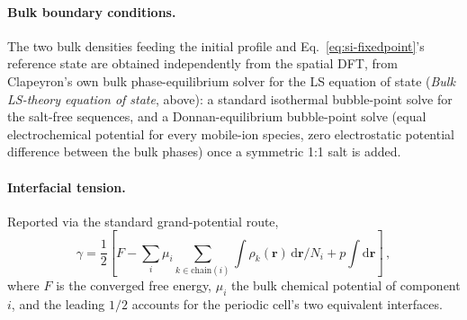 \documentclass[journal=macl,manuscript=suppinfo,layout=onecolumn]{achemso}
\begin{document}
\paragraph{Bulk boundary conditions.} The two bulk densities feeding the initial profile and Eq.~\ref{eq:si-fixedpoint}'s reference state are obtained independently from the spatial DFT, from Clapeyron's own bulk phase-equilibrium solver for the LS equation of state (\textit{Bulk LS-theory equation of state}, above): a standard isothermal bubble-point solve for the salt-free sequences, and a Donnan-equilibrium bubble-point solve (equal electrochemical potential for every mobile-ion species, zero electrostatic potential difference between the bulk phases) once a symmetric 1:1 salt is added.

\paragraph{Interfacial tension.} Reported via the standard grand-potential route,
\begin{equation}
    \gamma = \frac{1}{2}\left[F - \sum_i\mu_i\!\!\sum_{k\in\mathrm{chain}(i)}\!\!\int\rho_k(\mathbf{r})\,\mathrm{d}\mathbf{r}\Big/N_i + p\!\int\!\mathrm{d}\mathbf{r}\right]\,,
    \label{eq:si-gamma}
\end{equation}
where $F$ is the converged free energy, $\mu_i$ the bulk chemical potential of component $i$, and the leading $1/2$ accounts for the periodic cell's two equivalent interfaces.


\end{document}
